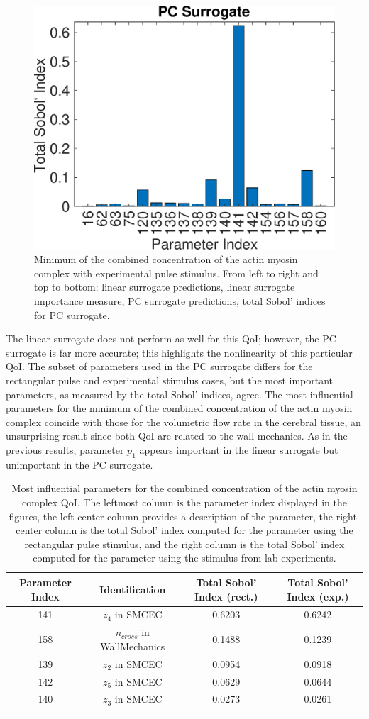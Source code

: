 \begin{figure}[h]
\hspace{.1 cm}
\includegraphics[width=.475 \textwidth]{Figures/AM_AMp_Min_QoI_PCE_SI_Experimental.eps}
\caption{Minimum of the combined concentration of the actin myosin complex with experimental pulse stimulus. From left to right and top to bottom: linear surrogate predictions, linear surrogate importance measure, PC surrogate predictions, total Sobol' indices for PC surrogate.}
\label{fig:qoi_AM_AMp_Min_exp}
\end{figure}

The linear surrogate does not perform as well for this QoI; however, the PC surrogate is far more accurate; this highlights the nonlinearity of this particular QoI. The subset of parameters used in the PC surrogate differs for the rectangular pulse and experimental stimulus cases, but the most important parameters, as measured by the total Sobol' indices, agree. The most influential parameters for the minimum of the combined concentration of the actin myosin complex coincide with those for the volumetric flow rate in the cerebral tissue, an unsurprising result since both QoI are related to the wall mechanics. As in the previous results, parameter $p_1$ appears important in the linear surrogate but unimportant in the PC surrogate.

\begin{table}[h]
\centering
{}
\begin{tabular}{cccc}
\toprule
Parameter Index & Identification & Total Sobol' Index (rect.) & Total Sobol' Index (exp.)\\
\midrule
141 & $z_4$ in SMCEC & 0.6203 & 0.6242\\
158 & $n_{cross}$ in WallMechanics & 0.1488 &0.1239\\
139 &  $z_2$ in SMCEC & 0.0954 &0.0918\\
142 & $z_5$ in SMCEC & 0.0629 & 0.0644\\
140 & $z_3$ in SMCEC & 0.0273 &0.0261\\
 \arrayrulecolor{black}\bottomrule
\end{tabular}
\caption{Most influential parameters for the combined concentration of the actin myosin complex QoI. The leftmost column is the parameter index displayed in the figures, the left-center column provides a description of the parameter, the right-center column is the total Sobol' index computed for the parameter using the rectangular pulse stimulus, and the right column is the total Sobol' index computed for the parameter using the stimulus from lab experiments.}
\label{tab:qoi_AM_AMp_Min}
\end{table}

